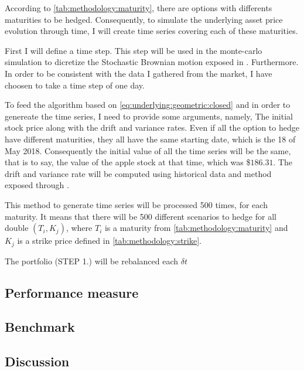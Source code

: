 \documentclass[12pt]{report}
\begin{document}
According to \cref{tab:methodology:maturity}, there are options with differents maturities to be hedged. Consequently, to simulate the underlying asset price evolution through time, I will create time series covering each of these maturities.

First I will define a time step. This step will be used in the monte-carlo simulation to dicretize the Stochastic Brownian motion exposed in \citet{bs}. Furthermore.
In order to be consistent with the data I gathered from the market, I have choosen to take a time step of one day.

To feed the algorithm based on \cref{eq:underlying:geometric:closed} and in order to genereate the time series, I need to provide some arguments, namely, The initial stock price along with the drift and variance rates.
Even if all the option to hedge have different maturities, they all have the same starting date, which is the 18 of May 2018. Consequently the initial value of all the time series will be the same, that is to say, the value of the apple stock at that time, which was \$$186.31$.
The drift and variance rate will be computed using historical data and method exposed through  .

This method to generate time series will be processed 500 times, for each maturity.
It means that there will be 500 different scenarios to hedge for all double $(T_i, K_j)$, where $T_i$ is a maturity from \cref{tab:methodology:maturity} and $K_j$ is a strike price defined in \cref{tab:methodology:strike}.

The portfolio (STEP 1.) will be rebalanced each $\delta t$


\subsection{Performance measure}
\label{sub:HedgingBSM:Performance}

\subsection{Benchmark}
\label{sub:HedgingBSM:Benchmark}

\subsection{Discussion}
\label{sub:HedgingBSM:Discussion}































\end{document}
